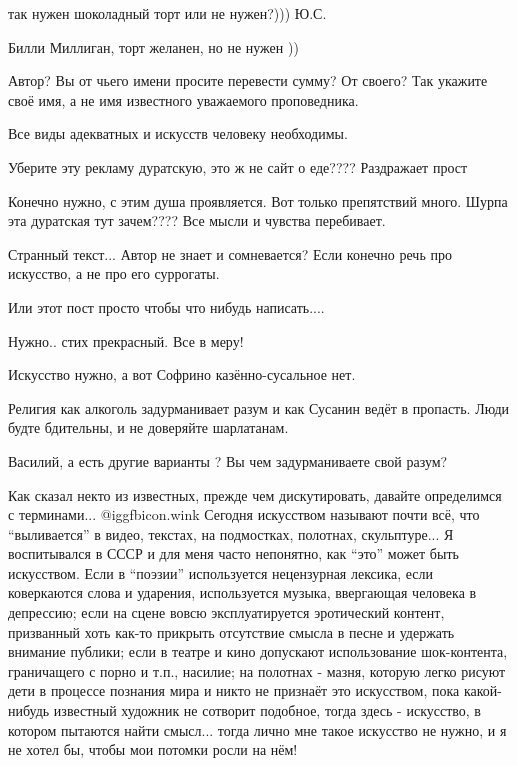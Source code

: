 \begin{itemize}
так нужен шоколадный торт или не нужен?))) Ю.С.

Билли Миллиган, торт желанен, но не нужен ))


Автор? Вы от чьего имени просите перевести сумму? От своего? Так укажите своё
имя, а не имя известного уважаемого проповедника.


Все виды адекватных и искусств человеку необходимы.

Уберите эту рекламу дуратскую, это ж не сайт о еде???? Раздражает прост

Конечно нужно, с этим душа проявляется. Вот только препятствий много. Шурпа эта
дуратская тут зачем???? Все мысли и чувства перебивает.


Странный текст... Автор не знает и сомневается? Если конечно речь про
искусство, а не про его суррогаты.

Или этот пост просто чтобы что нибудь написать....


Нужно.. стих прекрасный. Все в меру!

Искусство нужно, а вот Софрино казённо-сусальное нет.

Религия как алкоголь задурманивает разум и как Сусанин ведёт в пропасть. Люди
будте бдительны, и не доверяйте шарлатанам.


Василий, а есть другие варианты ? Вы чем задурманиваете свой разум?


Как сказал некто из известных, прежде чем дискутировать, давайте определимся с
терминами...  @igg{fbicon.wink}  Сегодня искусством называют почти всё, что \enquote{выливается} в
видео, текстах, на подмостках, полотнах, скульптуре... Я воспитывался в СССР и
для меня часто непонятно, как \enquote{это} может быть искусством. Если в \enquote{поэзии}
используется нецензурная лексика, если коверкаются слова и ударения,
используется музыка, ввергающая человека в депрессию; если на сцене вовсю
эксплуатируется эротический контент, призванный хоть как-то прикрыть отсутствие
смысла в песне и удержать внимание публики; если в театре и кино допускают
использование шок-контента, граничащего с порно и т.п., насилие; на полотнах -
мазня, которую легко рисуют дети в процессе познания мира и никто не признаёт
это искусством, пока какой-нибудь известный художник не сотворит подобное,
тогда здесь - искусство, в котором пытаются найти смысл... тогда лично мне
такое искусство не нужно, и я не хотел бы, чтобы мои потомки росли на нём!


\end{itemize}
